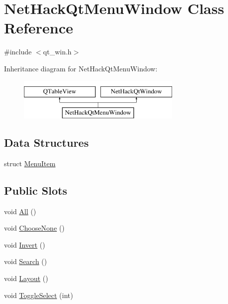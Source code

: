 \hypertarget{classNetHackQtMenuWindow}{\section{Net\+Hack\+Qt\+Menu\+Window Class Reference}
\label{classNetHackQtMenuWindow}
}


{\ttfamily \#include $<$qt\+\_\+win.\+h$>$}

Inheritance diagram for Net\+Hack\+Qt\+Menu\+Window\+:\begin{figure}[H]
\begin{center}
\leavevmode
\includegraphics[height=2.000000cm]{classNetHackQtMenuWindow}
\end{center}
\end{figure}
\subsection*{Data Structures}
\begin{DoxyCompactItemize}
\item 
struct \hyperlink{structNetHackQtMenuWindow_1_1MenuItem}{Menu\+Item}
\end{DoxyCompactItemize}
\subsection*{Public Slots}
\begin{DoxyCompactItemize}
\item 
void \hyperlink{classNetHackQtMenuWindow_a2960b85717081ca7e9dde294516e2ba0}{All} ()
\item 
void \hyperlink{classNetHackQtMenuWindow_adc224cf21cb4a5944ba14ce9498b4e36}{Choose\+None} ()
\item 
void \hyperlink{classNetHackQtMenuWindow_a0027c51e6cd5ebe6521c7eb7de319f3c}{Invert} ()
\item 
void \hyperlink{classNetHackQtMenuWindow_aa7345ab239882580395f367e39e5ff5b}{Search} ()
\item 
void \hyperlink{classNetHackQtMenuWindow_a68a2a4885296b7068c58ccbb21c8f555}{Layout} ()
\item 
void \hyperlink{classNetHackQtMenuWindow_a89c93c20216fbb2fd04445e9414d855b}{Toggle\+Select} (int)
\end{DoxyCompactItemize}
